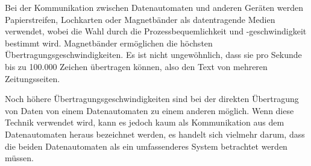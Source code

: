 {Bei der Kommunikation zwischen Datenautomaten und anderen Geräten werden Papierstreifen, Lochkarten oder Magnetbänder als datentragende Medien verwendet, wobei die Wahl durch die Prozessbequemlichkeit und -geschwindigkeit bestimmt wird. Magnetbänder ermöglichen die höchsten Übertragungsgeschwindigkeiten. Es ist nicht ungewöhnlich, dass sie pro Sekunde bis zu 100.000 Zeichen übertragen können, also den Text von mehreren Zeitungsseiten.

Noch höhere Übertragungsgeschwindigkeiten sind bei der direkten Übertragung von Daten von einem Datenautomaten zu einem anderen möglich. Wenn diese Technik verwendet wird, kann es jedoch kaum als Kommunikation aus dem Datenautomaten heraus bezeichnet werden, es handelt sich vielmehr darum, dass die beiden Datenautomaten als ein umfassenderes  System betrachtet werden müssen.
}


